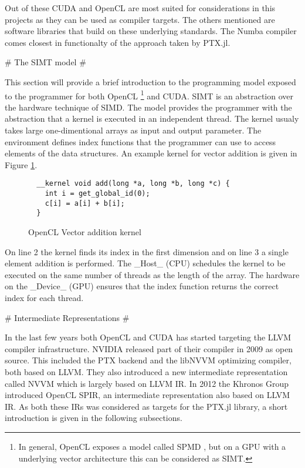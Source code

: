\begin{markdown}
Out of these \gls{CUDA} and \gls{OpenCL} are most suited for
considerations in this projects as they can be used as compiler
targets. The others mentioned are software libraries that build on
these underlying standards. The Numba compiler comes closest in
functionalty of the approach taken by PTX.jl.

# The SIMT model #
\label{sec:simt}

This section will provide a brief introduction to the programming
model exposed to the programmer for both OpenCL \footnote{In general,
  OpenCL exposes a model called \gls{SPMD} \cite{opencl}, but on a GPU
  with a underlying vector architecture this can be considered as
  SIMT.}  and CUDA. \gls{SIMT} is an abstraction over the hardware
technique of \gls{SIMD}. The model provides the programmer with the
abstraction that a kernel is executed in an independent thread. The
kernel usualy takes large one-dimentional arrays as input and output
parameter. The environment defines index functions that the programmer
can use to access elements of the data structures. An example kernel
for vector addition is given in Figure \ref{smit:add}.

\begin{figure}[H]
  \begin{verbatim}
  __kernel void add(long *a, long *b, long *c) {
    int i = get_global_id(0);
    c[i] = a[i] + b[i];
  }
  \end{verbatim}
  \caption{OpenCL Vector addition kernel}
  \label{smit:add}
\end{figure}

On line 2 the kernel finds its index in the first dimension and on
line 3 a single element addition is performed. The _Host_ (\gls{CPU})
schedules the kernel to be executed on the same number of threads as
the length of the array. The hardware on the _Device_ (\gls{GPU})
ensures that the index function returns the correct index for each
thread.

# Intermediate Representations #

In the last few years both \gls{OpenCL} and \gls{CUDA} has started
targeting the \gls{LLVM} compiler infrastructure. NVIDIA released part
of their compiler in 2009 as open source. This included the \gls{PTX}
backend \cite{nvptx} and the libNVVM \cite{libnvvm} optimizing
compiler, both based on \gls{LLVM}. They also introduced a new
intermediate representation called NVVM which is largely based on
\gls{LLVM} \gls{IR}. In 2012 the Khronos Group introduced \gls{OpenCL}
\gls{SPIR}, an intermediate representation also based on \gls{LLVM}
\gls{IR}. As both these \glspl{IR} was considered as targets for the
PTX.jl library, a short introduction is given in the following
subsections.


\end{markdown}
